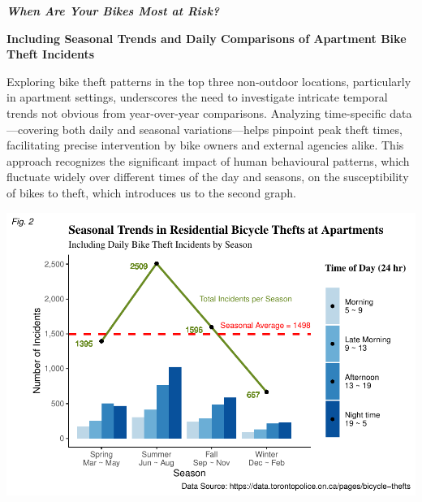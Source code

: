 \documentclass[
  11pt,
]{article}
\begin{document}
\newpage

\textit{\textbf{{When Are Your Bikes Most at Risk?}}}

\textbf{\footnotesize{Including Seasonal Trends and Daily Comparisons of Apartment Bike Theft Incidents}}

\indent Exploring bike theft patterns in the top three non-outdoor
locations, particularly in apartment settings, underscores the need to
investigate intricate temporal trends not obvious from year-over-year
comparisons. Analyzing time-specific data---covering both daily and
seasonal variations---helps pinpoint peak theft times, facilitating
precise intervention by bike owners and external agencies alike. This
approach recognizes the significant impact of human behavioural
patterns, which fluctuate widely over different times of the day and
seasons, on the susceptibility of bikes to theft, which introduces us to
the second graph.

\begin{center}\includegraphics{Bike_Theft_files/figure-latex/unnamed-chunk-6-1} \end{center}
\end{document}
